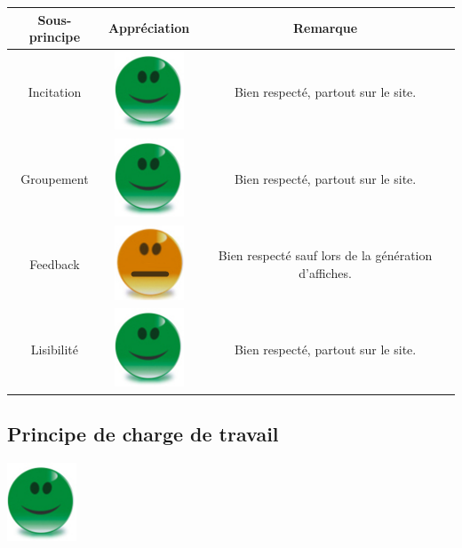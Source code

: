 \documentclass{article}
\begin{document}
\begin{sffamily}
\begin{center}
\begin{tabular}{c|c|c}
\textbf{Sous-principe} & \textbf{Appréciation} & \textbf{Remarque} \\
\hline
Incitation & \includegraphics[scale=0.27]{good.png} & Bien respecté, partout sur le site. \\
\hline
Groupement & \includegraphics[scale=0.27]{good.png} & Bien respecté, partout sur le site. \\
\hline
Feedback & \includegraphics[scale=0.365]{mid.png} & Bien respecté sauf lors de la génération d'affiches.\\
\hline
Lisibilité & \includegraphics[scale=0.27]{good.png} & Bien respecté, partout sur le site. \\
\end{tabular}
\end{center}

\subsection{Principe de charge de travail}

\includegraphics[scale=0.27]{good.png}


\end{sffamily}
\end{document}
